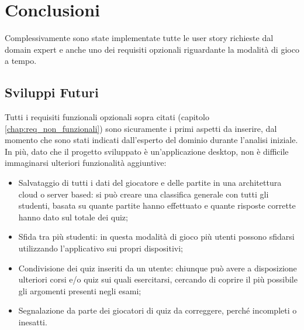 

\chapter{Conclusioni}\label{conclusioni}
    Complessivamente sono state implementate tutte le user story richieste dal domain expert e anche uno dei requisiti opzionali riguardante la modalità di gioco a tempo.

    \section{Sviluppi Futuri}
    Tutti i requisiti funzionali opzionali sopra citati (capitolo \ref{chap:req_non_funzionali}) sono sicuramente i primi aspetti da inserire, dal momento che sono stati indicati dall'esperto del dominio durante l'analisi iniziale.
    In più, dato che il progetto sviluppato è un'applicazione desktop, non è difficile immaginarsi ulteriori funzionalità aggiuntive:
    
    \begin{itemize}
        \item Salvataggio di tutti i dati del giocatore e delle partite in una architettura cloud o server based: si può creare una classifica generale con tutti gli studenti, basata su quante partite hanno effettuato e quante risposte corrette hanno dato sul totale dei quiz;
    
        \item Sfida tra più studenti: in questa modalità di gioco più utenti possono sfidarsi utilizzando l'applicativo sui propri dispositivi;
        
        \item Condivisione dei quiz inseriti da un utente: chiunque può avere a disposizione ulteriori corsi e/o quiz sui quali esercitarsi, cercando di coprire il più possibile gli argomenti presenti negli esami;
        
        \item Segnalazione da parte dei giocatori di quiz da correggere, perché incompleti o inesatti.
    \end{itemize}
    
    

    
    